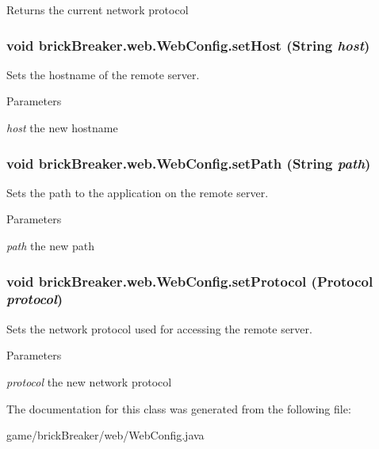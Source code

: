 \begin{DoxyReturn}{Returns}
the current network protocol 
\end{DoxyReturn}
\hypertarget{classbrick_breaker_1_1web_1_1_web_config_a9746602db48181b7228b39c85bb7b34e}{
\subsubsection[{setHost}]{\setlength{\rightskip}{0pt plus 5cm}void brickBreaker.web.WebConfig.setHost (String {\em host})}}
\label{classbrick_breaker_1_1web_1_1_web_config_a9746602db48181b7228b39c85bb7b34e}
Sets the hostname of the remote server.


\begin{DoxyParams}{Parameters}
\item[{\em host}]the new hostname \end{DoxyParams}
\hypertarget{classbrick_breaker_1_1web_1_1_web_config_a3f4efd872b5cc690c9511a4d2e49ee89}{
\subsubsection[{setPath}]{\setlength{\rightskip}{0pt plus 5cm}void brickBreaker.web.WebConfig.setPath (String {\em path})}}
\label{classbrick_breaker_1_1web_1_1_web_config_a3f4efd872b5cc690c9511a4d2e49ee89}
Sets the path to the application on the remote server.


\begin{DoxyParams}{Parameters}
\item[{\em path}]the new path \end{DoxyParams}
\hypertarget{classbrick_breaker_1_1web_1_1_web_config_acc5392f5644d6ca1a30736ca776a24eb}{
\subsubsection[{setProtocol}]{\setlength{\rightskip}{0pt plus 5cm}void brickBreaker.web.WebConfig.setProtocol ({\bf Protocol} {\em protocol})}}
\label{classbrick_breaker_1_1web_1_1_web_config_acc5392f5644d6ca1a30736ca776a24eb}
Sets the network protocol used for accessing the remote server.


\begin{DoxyParams}{Parameters}
\item[{\em protocol}]the new network protocol \end{DoxyParams}


The documentation for this class was generated from the following file:\begin{DoxyCompactItemize}
\item 
game/brickBreaker/web/WebConfig.java\end{DoxyCompactItemize}
